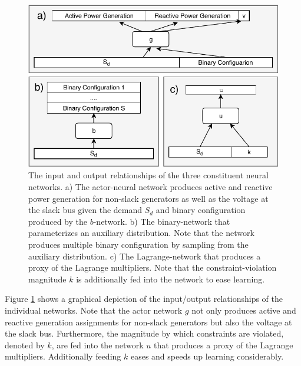 \begin{figure}[ht]
    \centering
    \includegraphics[width=\linewidth]{krtofl/network_structure.pdf}
    \caption[LOPF: Graphical depiction of the constituent Neural Networks.]{The input and output relationships of the three constituent neural networks. a) The actor-neural network produces active and reactive power generation for non-slack generators as well as the voltage at the slack bus given the demand $S_d$ and binary configuration produced by the $b$-network. b) The binary-network that parameterizes an auxiliary distribution. Note that the network produces multiple binary configuration by sampling from the auxiliary distribution. c) The Lagrange-network that produces a proxy of the Lagrange multipliers. Note that the constraint-violation magnitude $k$ is additionally fed into the network to ease learning.}
    \label{lopf:constituent_networks}
\end{figure}

Figure \ref{lopf:constituent_networks} shows a graphical depiction of the input/output relationships of the individual networks. Note that the actor network $g$ not only produces active and reactive generation assignments for non-slack generators but also the voltage at the slack bus. Furthermore, the magnitude by which constraints are violated, denoted by $k$, are fed into the network $u$ that produces a proxy of the Lagrange multipliers. Additionally feeding $k$ eases and speeds up learning considerably.


